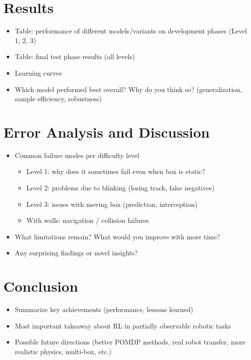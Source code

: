 \documentclass[11pt, oneside]{article}   	%
\begin{document}
\section{Results}
\begin{itemize}
    \item Table: performance of different models/variants on development phases (Level 1, 2, 3)
    \item Table: final test phase results (all levels)
    \item Learning curves 
    \item Which model performed best overall? Why do you think so? (generalization, sample efficiency, robustness)
\end{itemize}

\section{Error Analysis and Discussion}
\begin{itemize}
    \item Common failure modes per difficulty level
        \begin{itemize}
            \item Level 1: why does it sometimes fail even when box is static?
            \item Level 2: problems due to blinking (losing track, false negatives)
            \item Level 3: issues with moving box (prediction, interception)
            \item With walls: navigation / collision failures
        \end{itemize}

    \item What limitations remain? What would you improve with more time?
    \item Any surprising findings or novel insights?
\end{itemize}

\section{Conclusion}
\begin{itemize}
    \item Summarize key achievements (performance, lessons learned)
    \item Most important takeaway about RL in partially observable robotic tasks
    \item Possible future directions (better POMDP methods, real robot transfer, more realistic physics, multi-box, etc.)
\end{itemize}
\end{document}
